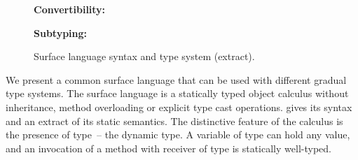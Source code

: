 \documentclass[USenglish]{tex/lipics-v2016}
\begin{document}
\begin{figure}[!b]
\begin{mathpar}
\end{mathpar}


{\bf Convertibility:}\\[-6mm]
  
\begin{mathpar}
    
    
\end{mathpar}


{\bf Subtyping:}\\[-6mm]

\begin{mathpar}



\end{mathpar}

\hrulefill
\caption{Surface language syntax and type system (extract).}\label{slts}
\end{figure}

We present a common surface language that can be used with different gradual
type systems. The surface language is a statically typed object calculus
without inheritance, method overloading or explicit type cast operations.
 gives its syntax and an extract of its static semantics. The
distinctive feature of the calculus is the presence of type \any\,-- the
dynamic type. A variable of type \any can hold any value, and an invocation
of a method with receiver of type \any is statically well-typed.
\end{document}
